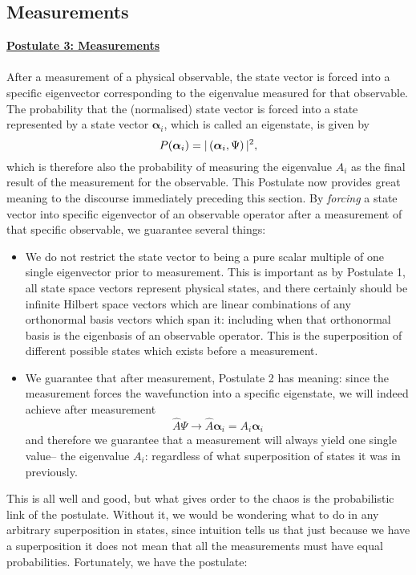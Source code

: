 \subsection{Measurements}
\underline{\textbf{Postulate 3: Measurements}}\\\\
After a measurement of a physical observable, the state vector is forced into a specific eigenvector corresponding to the eigenvalue measured for that observable. The probability that the (normalised) state vector is forced into a state represented by a state vector $\bm{\alpha}_{i}$, which is called an eigenstate, is given by
$$
P(\bm{\alpha}_{i})=|\left(\bm{\alpha}_{i},\Psi\right)|^2,
$$
which is therefore also the probability of measuring the eigenvalue $A_{i}$ as the final result of the measurement for the observable.
This Postulate now provides great meaning to the discourse immediately preceding this section. By \textit{forcing} a state vector into specific eigenvector of an observable operator after a measurement of that specific observable, we guarantee several things:
\begin{itemize}
    \item We do not restrict the state vector to being a pure scalar multiple of one single eigenvector prior to measurement. This is important as by Postulate 1, all state space vectors represent physical states, and there certainly should be infinite Hilbert space vectors which are linear combinations of any orthonormal basis vectors which span it: including when that orthonormal basis is the eigenbasis of an observable operator. This is the superposition of different possible states which exists before a measurement.
    \item We guarantee that after measurement, Postulate 2 has meaning: since the measurement forces the wavefunction into a specific eigenstate, we will indeed achieve after measurement
    $$
    \hat{A}\Psi\to \hat{A}\bm{\alpha}_{i}=A_{i}\bm{\alpha}_{i}
    $$
    and therefore we guarantee that a measurement will always yield one single value-- the eigenvalue $A_{i}$: regardless of what superposition of states it was in previously. 
\end{itemize}
This is all well and good, but what gives order to the chaos is the probabilistic link of the postulate. Without it, we would be wondering what to do in any arbitrary superposition in states, since intuition tells us that just because we have a superposition it does not mean that all the measurements must have equal probabilities. Fortunately, we have the postulate:
